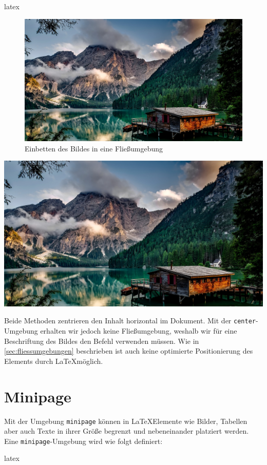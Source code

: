 \begin{showcase}
    \begin{code}{latex}
        \begin{figure}
            \centering
            \includegraphics[width=0.4\columnwidth]{assets/images/bilder/pexels-pixabay-147411.jpg}
            \caption{Einbetten des Bildes in eine Fließumgebung}
        \end{figure}
    \end{code}
    \tcblower
    \begin{center}
        \includegraphics[width=0.4\columnwidth]{assets/images/bilder/pexels-pixabay-147411.jpg}
    \end{center}
\end{showcase}

Beide Methoden zentrieren den Inhalt horizontal im Dokument. Mit der \texttt{center}-Umgebung erhalten wir jedoch keine Fließumgebung, weshalb wir für eine Beschriftung des Bildes den Befehl \texttt{} verwenden müssen. Wie in \autoref{sec:fliessumgebungen} beschrieben ist auch keine optimierte Positionierung des Elements durch \LaTeX möglich.

\section{Minipage}
\label{sec:minipage}
Mit der Umgebung \texttt{minipage} können in \LaTeX Elemente wie Bilder, Tabellen aber auch Texte in ihrer Größe begrenzt und nebeneinander platziert werden. Eine \texttt{minipage}-Umgebung wird wie folgt definiert:

\begin{code}{latex}
    \begin{minipage}[outer position][height][inner pos]{width}
    \end{minipage}
\end{code}


